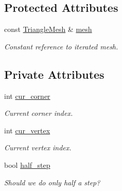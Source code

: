 \subsection*{Protected Attributes}
\begin{DoxyCompactItemize}
\item 
\mbox{\label{classgeoproc_1_1iterators_1_1mesh__iterator_a6102e0c43bcf7008597387a2f085ca0e}} 
const \hyperlink{classgeoproc_1_1TriangleMesh}{Triangle\+Mesh} \& \hyperlink{classgeoproc_1_1iterators_1_1mesh__iterator_a6102e0c43bcf7008597387a2f085ca0e}{mesh}
\begin{DoxyCompactList}\small\item\em Constant reference to iterated mesh. \end{DoxyCompactList}\end{DoxyCompactItemize}
\subsection*{Private Attributes}
\begin{DoxyCompactItemize}
\item 
\mbox{\label{classgeoproc_1_1iterators_1_1vertex_1_1vertex__vertex__iterator_a76628cb7b70644f2e1804c5ea52c94f7}} 
int \hyperlink{classgeoproc_1_1iterators_1_1vertex_1_1vertex__vertex__iterator_a76628cb7b70644f2e1804c5ea52c94f7}{cur\+\_\+corner}
\begin{DoxyCompactList}\small\item\em Current corner index. \end{DoxyCompactList}\item 
\mbox{\label{classgeoproc_1_1iterators_1_1vertex_1_1vertex__vertex__iterator_a94e6bf674777a2e825678df7aba64ebd}} 
int \hyperlink{classgeoproc_1_1iterators_1_1vertex_1_1vertex__vertex__iterator_a94e6bf674777a2e825678df7aba64ebd}{cur\+\_\+vertex}
\begin{DoxyCompactList}\small\item\em Current vertex index. \end{DoxyCompactList}\item 
bool \hyperlink{classgeoproc_1_1iterators_1_1vertex_1_1vertex__vertex__iterator_a3e22144ee36c4739d316aca005e17d87}{half\+\_\+step}
\begin{DoxyCompactList}\small\item\em Should we do only half a step? \end{DoxyCompactList}\end{DoxyCompactItemize}


